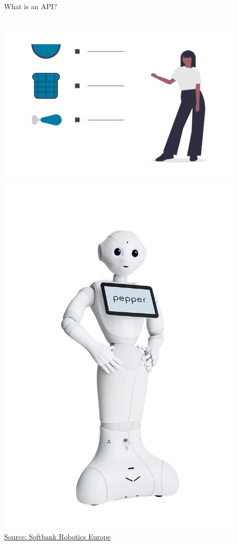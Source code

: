 \documentclass[xcolor=x11names,compress]{beamer}
\renewcommand{\(}{\begin{columns}}
\renewcommand{\)}{\end{columns}}
\newcommand{\<}[1]{\begin{column}{#1}}
\renewcommand{\>}{\end{column}}
\begin{document}
\begin{frame}{What is an API?}
\begin{columns}[T]
    \begin{column}{0.3\textwidth}
    \begin{center}
      \includegraphics[width=0.9\textwidth]{undraw_diet_ghvw.png} \\
      \includegraphics[width=0.9\textwidth]{Pepper_the_Robot.jpg} \\
      \textcolor{gris}{\tiny \href{https://commons.wikimedia.org/wiki/File:Pepper_the_Robot.jpg}{Source: Softbank Robotics Europe}}
    \end{center}
    \end{column}
\end{columns}
\end{frame}
\end{document}
